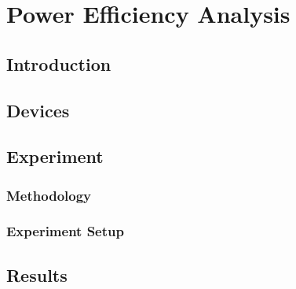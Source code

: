 
\chapter{Power Efficiency Analysis} %

\label{Chapter6} %



\section{Introduction}

\section{Devices}

\section{Experiment}

\subsection{Methodology}

\subsection{Experiment Setup}

\section{Results}
